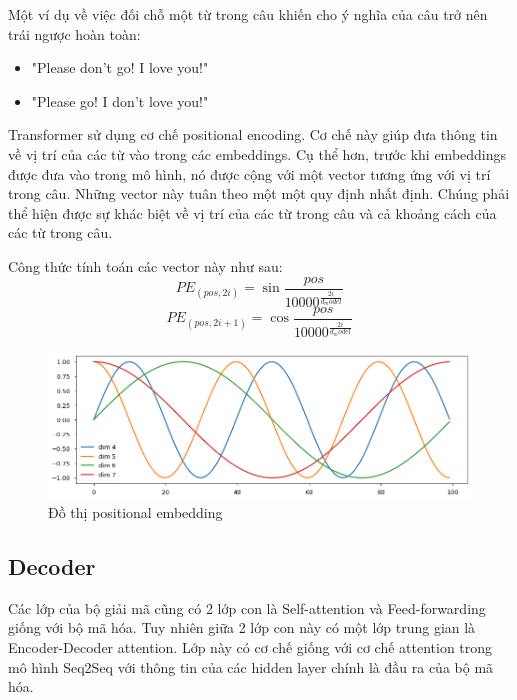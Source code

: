 Một ví dụ về việc đối chỗ một từ trong câu khiến cho ý nghĩa của câu trở nên trái ngược hoàn toàn:
\begin{itemize}
	\item "Please don't go! I love you!"
	\item "Please go! I don't love you!"
\end{itemize}

Transformer sử dụng cơ chế positional encoding. Cơ chế này giúp đưa thông tin về vị trí của các từ vào trong các embeddings. Cụ thể hơn, trước khi embeddings được đưa vào trong mô hình, nó được cộng với một vector tương ứng với vị trí trong câu. Những vector này tuân theo một một quy định nhất định. Chúng phải thể hiện được sự khác biệt về vị trí của các từ trong câu và cả khoảng cách của các từ trong câu. 

Công thức tính toán các vector này như sau: 
\begin{equation*}
	PE_{(pos, 2i)} = \sin{\frac{pos}{10000^{\frac{2i}{d_model}}}}
\end{equation*}
\begin{equation*}
	PE_{(pos, 2i+1)} = \cos{\frac{pos}{10000^{\frac{2i}{d_model}}}}
\end{equation*}

\begin{figure}[H]
    \begin{center}
        \includegraphics[scale=0.5]{images/positional-embedding}
        \caption{Đồ thị positional embedding}
        \label{fig:positional embedding}
    \end{center}
\end{figure}



\subsection{Decoder}
Các lớp của bộ giải mã cũng có 2 lớp con là Self-attention và Feed-forwarding giống với bộ mã hóa. Tuy nhiên giữa 2 lớp con này có một lớp trung gian là Encoder-Decoder attention. Lớp này có cơ chế giống với cơ chế attention trong mô hình Seq2Seq với thông tin của các hidden layer chính là đầu ra của bộ mã hóa.

